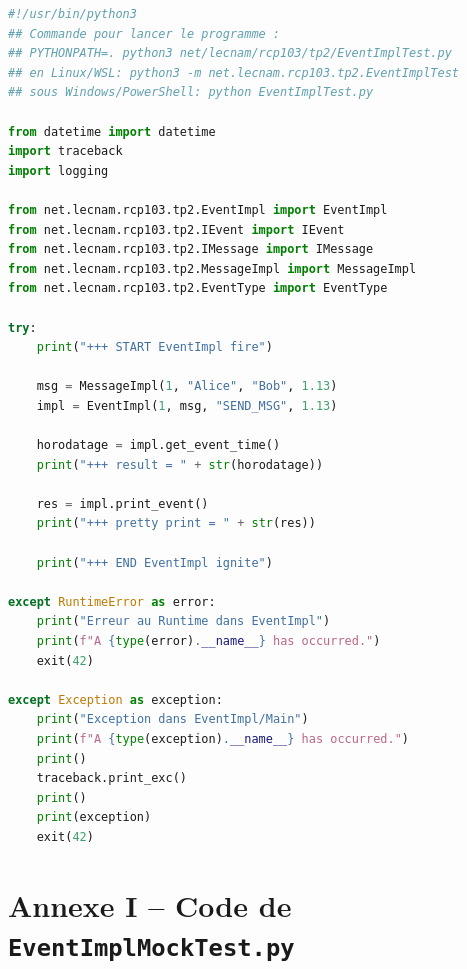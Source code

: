 \documentclass{article}
\begin{document}
\begin{lstlisting}[language=Python, caption=EventImplTest.py]
#!/usr/bin/python3
## Commande pour lancer le programme :
## PYTHONPATH=. python3 net/lecnam/rcp103/tp2/EventImplTest.py
## en Linux/WSL: python3 -m net.lecnam.rcp103.tp2.EventImplTest
## sous Windows/PowerShell: python EventImplTest.py

from datetime import datetime
import traceback
import logging

from net.lecnam.rcp103.tp2.EventImpl import EventImpl
from net.lecnam.rcp103.tp2.IEvent import IEvent
from net.lecnam.rcp103.tp2.IMessage import IMessage
from net.lecnam.rcp103.tp2.MessageImpl import MessageImpl
from net.lecnam.rcp103.tp2.EventType import EventType

try:
    print("+++ START EventImpl fire")

    msg = MessageImpl(1, "Alice", "Bob", 1.13)
    impl = EventImpl(1, msg, "SEND_MSG", 1.13)

    horodatage = impl.get_event_time()
    print("+++ result = " + str(horodatage))

    res = impl.print_event()
    print("+++ pretty print = " + str(res))

    print("+++ END EventImpl ignite")

except RuntimeError as error:
    print("Erreur au Runtime dans EventImpl")
    print(f"A {type(error).__name__} has occurred.")
    exit(42)

except Exception as exception:
    print("Exception dans EventImpl/Main")
    print(f"A {type(exception).__name__} has occurred.")
    print()
    traceback.print_exc()
    print()
    print(exception)
    exit(42)
\end{lstlisting}

\section{Annexe I -- Code de \texttt{EventImplMockTest.py}}
\end{document}
